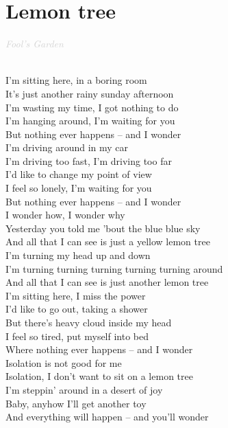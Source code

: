 \documentclass[a5paper, 10pt]{book}
\begin{document}
\section{Lemon tree}\textcolor{lightgray}{\textit{Fool's Garden}}\\~\\
\begin{minipage}[t]{0.8\textwidth}
I’m sitting here, in a boring room \\
It’s just another rainy sunday afternoon\\
I’m wasting my time, I got nothing to do\\
I’m hanging around, I’m waiting for you\\
But nothing ever happens – and I wonder\\

I’m driving around in my car\\
I’m driving too fast, I’m driving too far\\
I’d like to change my point of view\\
I feel so lonely, I’m waiting for you\\
But nothing ever happens – and I wonder\\

\hspace*{5mm}I wonder how, I wonder why\\
\hspace*{5mm}Yesterday you told me ’bout the blue blue sky \\
\hspace*{5mm}And all that I can see is just a yellow lemon tree\\

\hspace*{5mm}I’m turning my head up and down\\
\hspace*{5mm}I’m turning turning turning turning turning around\\
\hspace*{5mm}And all that I can see is just another lemon tree\\

I’m sitting here, I miss the power \\
I’d like to go out, taking a shower\\
But there’s heavy cloud inside my head\\
I feel so tired, put myself into bed\\
Where nothing ever happens – and I wonder \\

\hspace*{3mm}Isolation is not good for me\\
\hspace*{3mm}Isolation, I don’t want to sit on a lemon tree \\

I’m steppin’ around in a desert of joy\\
Baby, anyhow I’ll get another toy\\
And everything will happen – and you’ll wonder\\

\end{minipage}
\end{document}

